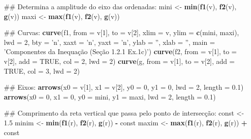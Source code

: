 \documentclass[]{book}
\newenvironment{Shaded}{\begin{snugshade}}{\end{snugshade}}
\newcommand{\KeywordTok}[1]{\textcolor[rgb]{0.13,0.29,0.53}{\textbf{#1}}}
\newcommand{\DataTypeTok}[1]{\textcolor[rgb]{0.13,0.29,0.53}{#1}}
\newcommand{\DecValTok}[1]{\textcolor[rgb]{0.00,0.00,0.81}{#1}}
\newcommand{\FloatTok}[1]{\textcolor[rgb]{0.00,0.00,0.81}{#1}}
\newcommand{\StringTok}[1]{\textcolor[rgb]{0.31,0.60,0.02}{#1}}
\newcommand{\OtherTok}[1]{\textcolor[rgb]{0.56,0.35,0.01}{#1}}
\newcommand{\OperatorTok}[1]{\textcolor[rgb]{0.81,0.36,0.00}{\textbf{#1}}}
\newcommand{\NormalTok}[1]{#1}
\begin{document}
\begin{enumerate}
\begin{Shaded}
\begin{Highlighting}[]
\NormalTok{##  Determina  a amplitude do eixo das ordenadas:}
\NormalTok{mini <-}\StringTok{ }\KeywordTok{min}\NormalTok{(}\KeywordTok{f1}\NormalTok{(v), }\KeywordTok{f2}\NormalTok{(v), }\KeywordTok{g}\NormalTok{(v))}
\NormalTok{maxi <-}\StringTok{ }\KeywordTok{max}\NormalTok{(}\KeywordTok{f1}\NormalTok{(v), }\KeywordTok{f2}\NormalTok{(v), }\KeywordTok{g}\NormalTok{(v))}

\NormalTok{##  Curvas:}
\KeywordTok{curve}\NormalTok{(f1, }\DataTypeTok{from =}\NormalTok{ v[}\DecValTok{1}\NormalTok{], }\DataTypeTok{to =}\NormalTok{ v[}\DecValTok{2}\NormalTok{], }\DataTypeTok{xlim =}\NormalTok{ v, }\DataTypeTok{ylim =} \KeywordTok{c}\NormalTok{(mini, maxi), }\DataTypeTok{lwd =} \DecValTok{2}\NormalTok{,}
  \DataTypeTok{bty =} \StringTok{'n'}\NormalTok{, }\DataTypeTok{xaxt =} \StringTok{'n'}\NormalTok{, }\DataTypeTok{yaxt =} \StringTok{'n'}\NormalTok{, }\DataTypeTok{ylab =} \StringTok{''}\NormalTok{, }\DataTypeTok{xlab =} \StringTok{''}\NormalTok{,}
  \DataTypeTok{main =} \StringTok{'Componentes da Inequação (Seção 1.2.1 Ex.1c)'}\NormalTok{)}
\KeywordTok{curve}\NormalTok{(f2, }\DataTypeTok{from =}\NormalTok{ v[}\DecValTok{1}\NormalTok{], }\DataTypeTok{to =}\NormalTok{ v[}\DecValTok{2}\NormalTok{], }\DataTypeTok{add =} \OtherTok{TRUE}\NormalTok{, }\DataTypeTok{col =} \DecValTok{2}\NormalTok{, }\DataTypeTok{lwd =} \DecValTok{2}\NormalTok{)}
\KeywordTok{curve}\NormalTok{(g, }\DataTypeTok{from =}\NormalTok{ v[}\DecValTok{1}\NormalTok{], }\DataTypeTok{to =}\NormalTok{ v[}\DecValTok{2}\NormalTok{], }\DataTypeTok{add =} \OtherTok{TRUE}\NormalTok{, }\DataTypeTok{col =} \DecValTok{3}\NormalTok{, }\DataTypeTok{lwd =} \DecValTok{2}\NormalTok{)}

\NormalTok{##  Eixos:}
\KeywordTok{arrows}\NormalTok{(}\DataTypeTok{x0 =}\NormalTok{ v[}\DecValTok{1}\NormalTok{], }\DataTypeTok{x1 =}\NormalTok{ v[}\DecValTok{2}\NormalTok{],}
   \DataTypeTok{y0 =} \DecValTok{0}\NormalTok{, }\DataTypeTok{y1 =} \DecValTok{0}\NormalTok{, }\DataTypeTok{lwd =} \DecValTok{2}\NormalTok{, }\DataTypeTok{length =} \FloatTok{0.1}\NormalTok{)}
\KeywordTok{arrows}\NormalTok{(}\DataTypeTok{x0 =} \DecValTok{0}\NormalTok{, }\DataTypeTok{x1 =} \DecValTok{0}\NormalTok{,}
   \DataTypeTok{y0 =}\NormalTok{ mini, }\DataTypeTok{y1 =}\NormalTok{ maxi, }\DataTypeTok{lwd =} \DecValTok{2}\NormalTok{, }\DataTypeTok{length =} \FloatTok{0.1}\NormalTok{)}

\NormalTok{##  Comprimento da reta vertical que passa pelo ponto de intersecção:}
\NormalTok{const <-}\StringTok{ }\FloatTok{1.5}
\NormalTok{minim <-}\StringTok{ }\KeywordTok{min}\NormalTok{(}\KeywordTok{f1}\NormalTok{(r), }\KeywordTok{f2}\NormalTok{(r), }\KeywordTok{g}\NormalTok{(r)) }\OperatorTok{-}\StringTok{ }\NormalTok{const}
\NormalTok{maxim <-}\StringTok{ }\KeywordTok{max}\NormalTok{(}\KeywordTok{f1}\NormalTok{(r), }\KeywordTok{f2}\NormalTok{(r), }\KeywordTok{g}\NormalTok{(r)) }\OperatorTok{+}\StringTok{ }\NormalTok{const}


\end{Highlighting}
\end{Shaded}
\end{enumerate}
\end{document}
